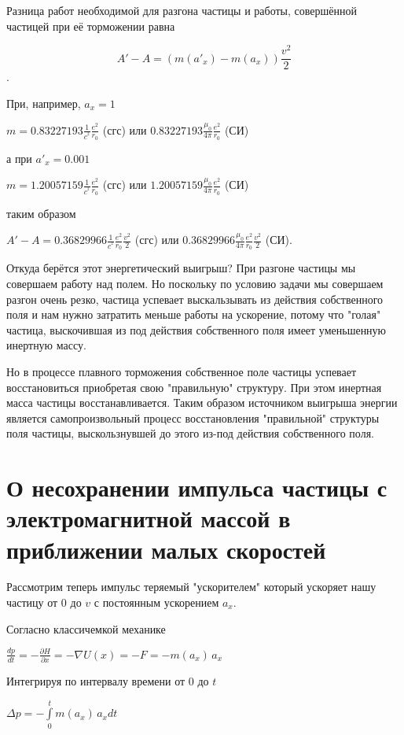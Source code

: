 \documentclass{article}
\begin{document}
Разница работ необходимой для разгона частицы и работы, совершённой частицей при её торможении равна


\[A' - A  = \left(m(a'_x) - m(a_x)\right)\frac{v^2}{2}\].

При, например, $a_x=1$

$m = 0.83227193\frac{1}{{{c}^{^{2}}}}\frac{e^2}{{{r}_{0}}}$ (сгс) или
$0.83227193\frac{{{\mu }_{0}}}{4\pi }\frac{e^2}{{{r}_{0}}}$ (СИ)

а при $a'_x=0.001$

$m = 1.20057159\frac{1}{{{c}^{^{2}}}}\frac{e^2}{{{r}_{0}}}$ (сгс) или
$1.20057159\frac{{{\mu }_{0}}}{4\pi }\frac{e^2}{{{r}_{0}}}$ (СИ)

таким образом

$A' - A  = 0.36829966\frac{1}{{{c}^{^{2}}}}\frac{e^2}{{{r}_{0}}}\frac{v^2}{2}$  (сгс) или
$0.36829966\frac{{{\mu }_{0}}}{4\pi }\frac{e^2}{{{r}_{0}}}\frac{v^2}{2}$  (СИ).

Откуда берётся этот энергетический выигрыш? При разгоне частицы мы совершаем работу над полем. Но поскольку по условию задачи мы совершаем разгон очень резко, частица успевает выскальзывать из действия собственного поля и нам нужно затратить меньше работы на ускорение, потому что "голая" частица, выскочившая из под действия собственного поля имеет уменьшенную инертную массу.

Но в процессе плавного торможения собственное поле частицы успевает восстановиться приобретая свою "правильную" структуру. При этом инертная масса частицы восстанавливается. Таким образом источником выигрыша энергии является самопроизвольный процесс восстановления "правильной" структуры поля частицы, выскользнувшей до этого из-под действия собственного поля.


\section{О несохранении импульса частицы с электромагнитной массой в приближении малых скоростей}

Рассмотрим теперь импульс теряемый "ускорителем" который ускоряет нашу частицу от $0$ до $v$ с постоянным ускорением $a_x$.

Согласно классичемкой механике

$\frac{dp}{dt} = - \frac{\partial H}{\partial x} = - \nabla U(x) = -F = - m(a_x) \, a_x$

Интегрируя по интервалу времени от $0$ до $t$

$\Delta p = - \int\limits_{0}^{t} m(a_x) \, a_x dt$
\end{document}
